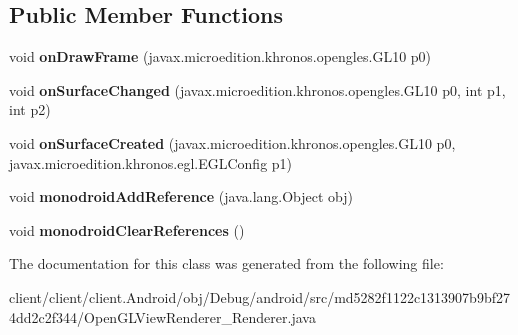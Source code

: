 \subsection*{Public Member Functions}
\begin{DoxyCompactItemize}
\item 
\hypertarget{classmd5282f1122c1313907b9bf274dd2c2f344_1_1OpenGLViewRenderer__Renderer_ae7e9cc67cebebfc37d639ac7db4724db}{}void {\bfseries on\+Draw\+Frame} (javax.\+microedition.\+khronos.\+opengles.\+G\+L10 p0)\label{classmd5282f1122c1313907b9bf274dd2c2f344_1_1OpenGLViewRenderer__Renderer_ae7e9cc67cebebfc37d639ac7db4724db}

\item 
\hypertarget{classmd5282f1122c1313907b9bf274dd2c2f344_1_1OpenGLViewRenderer__Renderer_a865e437842937b21c269b5b7f4d839bd}{}void {\bfseries on\+Surface\+Changed} (javax.\+microedition.\+khronos.\+opengles.\+G\+L10 p0, int p1, int p2)\label{classmd5282f1122c1313907b9bf274dd2c2f344_1_1OpenGLViewRenderer__Renderer_a865e437842937b21c269b5b7f4d839bd}

\item 
\hypertarget{classmd5282f1122c1313907b9bf274dd2c2f344_1_1OpenGLViewRenderer__Renderer_a4c558266ac95355516279ef4745fc3b0}{}void {\bfseries on\+Surface\+Created} (javax.\+microedition.\+khronos.\+opengles.\+G\+L10 p0, javax.\+microedition.\+khronos.\+egl.\+E\+G\+L\+Config p1)\label{classmd5282f1122c1313907b9bf274dd2c2f344_1_1OpenGLViewRenderer__Renderer_a4c558266ac95355516279ef4745fc3b0}

\item 
\hypertarget{classmd5282f1122c1313907b9bf274dd2c2f344_1_1OpenGLViewRenderer__Renderer_a818fc060d9cc6a8f2b06f1cdb700d399}{}void {\bfseries monodroid\+Add\+Reference} (java.\+lang.\+Object obj)\label{classmd5282f1122c1313907b9bf274dd2c2f344_1_1OpenGLViewRenderer__Renderer_a818fc060d9cc6a8f2b06f1cdb700d399}

\item 
\hypertarget{classmd5282f1122c1313907b9bf274dd2c2f344_1_1OpenGLViewRenderer__Renderer_a5beb2b62e82fc26ebea86a248fbf9a6b}{}void {\bfseries monodroid\+Clear\+References} ()\label{classmd5282f1122c1313907b9bf274dd2c2f344_1_1OpenGLViewRenderer__Renderer_a5beb2b62e82fc26ebea86a248fbf9a6b}

\end{DoxyCompactItemize}


The documentation for this class was generated from the following file\+:\begin{DoxyCompactItemize}
\item 
client/client/client.\+Android/obj/\+Debug/android/src/md5282f1122c1313907b9bf274dd2c2f344/Open\+G\+L\+View\+Renderer\+\_\+\+Renderer.\+java\end{DoxyCompactItemize}
